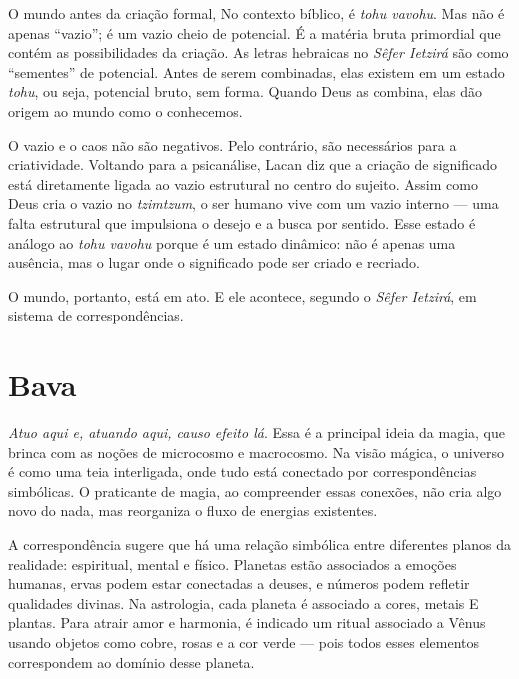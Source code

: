 {%

O mundo antes da criação formal, No contexto bíblico, é \textit{tohu vavohu}. Mas não é apenas ``vazio''; é um vazio cheio de potencial. É a matéria bruta primordial que contém as possibilidades da criação. As letras hebraicas no \textit{Sêfer Ietzirá} são como “sementes” de potencial. Antes de serem combinadas, elas existem em um estado \textit{tohu}, ou seja, potencial bruto, sem forma. Quando Deus as combina, elas dão origem ao mundo como o conhecemos.

O vazio e o caos não são negativos. Pelo contrário, são necessários para a criatividade. Voltando para a psicanálise, Lacan diz que a criação de significado está diretamente ligada ao vazio estrutural no centro do sujeito. Assim como Deus cria o vazio no \textit{tzimtzum}, o ser humano vive com um vazio interno --- uma falta estrutural que impulsiona o desejo e a busca por sentido. Esse estado é análogo ao \textit{tohu vavohu} porque é um estado dinâmico: não é apenas uma ausência, mas o lugar onde o significado pode ser criado e recriado.

O mundo, portanto, está em ato. E ele acontece, segundo o \textit{Sêfer Ietzirá}, em sistema de correspondências.

\chapter*{Bava \smallskip{}}

\begin{center}
{\huge{}}
\end{center}

\textit{Atuo aqui e, atuando aqui, causo efeito lá}. Essa é a principal ideia da magia, que brinca com as noções de microcosmo e macrocosmo. Na visão mágica, o universo é como uma teia interligada, onde tudo está conectado por correspondências simbólicas. O praticante de magia, ao compreender essas conexões, não cria algo novo do nada, mas reorganiza o fluxo de energias existentes.

A correspondência sugere que há uma relação simbólica entre diferentes planos da realidade: espiritual, mental e físico. Planetas estão associados a emoções humanas, ervas podem estar conectadas a deuses, e números podem refletir qualidades divinas. Na astrologia, cada planeta é associado a cores, metais E plantas. Para atrair amor e harmonia, é indicado um ritual associado a Vênus usando objetos como cobre, rosas e a cor verde --- pois todos esses elementos correspondem ao domínio desse planeta.

}
